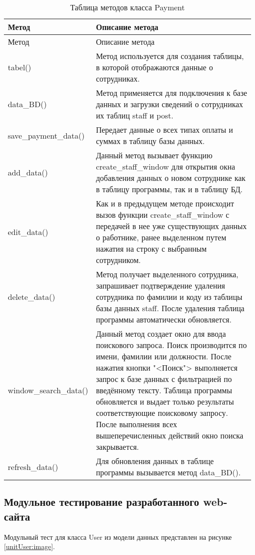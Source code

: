 \begin{xltabular}{\textwidth}{|p{6cm}|X|}
	\caption{Таблица методов класса Payment\label{class:table_class_staff}} \hline
	\centrow Метод & \centrow Описание метода \\ \hline
	\endfirsthead
	\centrow Метод & \centrow Описание метода \\ \hline
	\finishhead
	tabel() & Метод используется для создания таблицы, в которой отображаются данные о сотрудниках.\\ \hline
	data\_BD() & Метод применяется для подключения к базе данных и загрузки сведений о сотрудниках их таблиц staff и post. \\ \hline 
	save\_payment\_data() & Передает данные о всех типах оплаты и суммах в таблицу базы данных. \\ \hline 
	add\_data() & Данный метод вызывает функцию create\_staff\_window для открытия окна добавления данных о новом сотруднике как в таблицу программы, так и в таблицу БД.  \\ \hline 
	edit\_data() & Как и в предыдущем методе происходит вызов функции create\_staff\_window  с передачей в нее уже существующих данных о работнике, ранее выделенном путем нажатия на строку с выбранным сотрудником. \\ \hline
	delete\_data() & Метод получает выделенного сотрудника, запрашивает подтверждение удаления сотрудника по фамилии и коду из таблицы базы данных staff. После удаления таблица программы автоматически обновляется. \\ \hline
	window\_search\_data() & Данный метод создает окно для ввода поискового запроса. Поиск производится по имени, фамилии или должности. После нажатия кнопки "<Поиск"> выполняется запрос к базе данных с фильтрацией по введённому тексту. Таблица программы обновляется и выдает только результаты соответствующие поисковому запросу. После выполнения всех вышеперечисленных действий окно поиска закрывается.  \\ \hline
	refresh\_data() & Для обновления данных в таблице программы вызывается метод data\_BD().
	
\end{xltabular}

\subsection{Модульное тестирование разработанного web-сайта}

Модульный тест для класса User из модели данных представлен на рисунке \ref{unitUser:image}.

